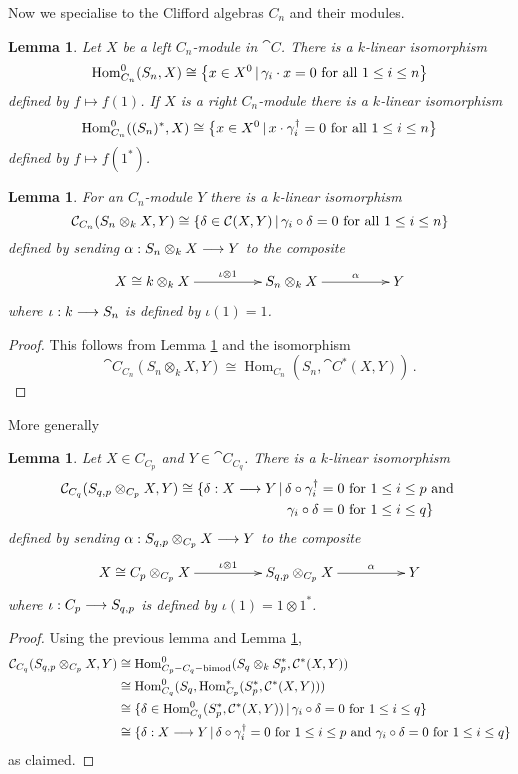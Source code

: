 \documentclass[english,letter paper,12pt,leqno]{article}
\newtheorem{lemma}[theorem]{Lemma}
\theoremstyle{example}
\numberwithin{equation}{section}
\def\Hom{\operatorname{Hom}}
\def\ferm{\gamma}
\def\fermc{\gamma^\dagger}
\begin{document}
Now we specialise to the Clifford algebras $C_n$ and their modules.

\begin{lemma}\label{lemma:simplehom} Let $X$ be a left $C_n$-module in $\cat{C}$. There is a $k$-linear isomorphism
\[
\Hom_{C_n}^0( S_n, X ) \cong \big\{ x \in X^0 \l \ferm_i \cdot x = 0 \text{ for all } 1 \le i \le n \big\}
\]
defined by $f \mapsto f(1)$. If $X$ is a right $C_n$-module there is a $k$-linear isomorphism
\[
\Hom^0_{C_n}( (S_n)^*, X ) \cong \big\{ x \in X^0 \l x \cdot \fermc_i = 0 \text{ for all } 1 \le i \le n \big\}
\]
defined by $f \mapsto f(1^*)$.
\end{lemma}

\begin{lemma}\label{lemma:morphism_out_1} For an $C_n$-module $Y$ there is a $k$-linear isomorphism
\[
\cat{C}_{C_n}( S_n \otimes_k X, Y ) \cong \{ \delta \in \cat{C}(X,Y) \l \ferm_i \circ \delta = 0 \text{ for all } 1 \le i \le n \}
\]
defined by sending $\alpha: S_n \otimes_k X \longrightarrow Y$ to the composite
\[
\xymatrix@C+2pc{
X \cong k \otimes_k X \ar[r]^-{\iota \otimes 1} & S_n \otimes_k X \ar[r]^-{\alpha} & Y
}
\]
where $\iota: k \longrightarrow S_n$ is defined by $\iota(1) = 1$.
\end{lemma}
\begin{proof}
This follows from Lemma \ref{lemma:simplehom} and the isomorphism
\[
\cat{C}_{C_n}(S_n \otimes_k X, Y ) \cong \Hom_{C_n}( S_n, \cat{C}^*(X,Y) )\,.
\]
\end{proof}

More generally

\begin{lemma}\label{lemma:morphisms_two_forms} Let $X \in C_{C_p}$ and $Y \in \cat{C}_{C_q}$. There is a $k$-linear isomorphism
\begin{align*}
\cat{C}_{C_q}( S_{q,p} \otimes_{C_p} X, Y ) \cong \{ \delta: X \lto Y \l \delta \circ \fermc_i &= 0 \text{ for } 1 \le i \le p \text{ and }\\ \ferm_i \circ \delta &= 0 \text{ for } 1 \le i \le q \}
\end{align*}
defined by sending $\alpha: S_{q,p} \otimes_{C_p} X \longrightarrow Y$ to the composite
\[
\xymatrix@C+2pc{
X \cong C_p \otimes_{C_p} X \ar[r]^-{\iota \otimes 1} & S_{q,p} \otimes_{C_p} X \ar[r]^-{\alpha} & Y
}
\]
where $\iota: C_p \longrightarrow S_{q,p}$ is defined by $\iota(1) = 1 \otimes 1^*$.
\end{lemma}
\begin{proof}
Using the previous lemma and Lemma \ref{lemma:simplehom},
\begin{align*}
\cat{C}_{C_q}( S_{q,p} \otimes_{C_p} X, Y ) &\cong \Hom^0_{C_p-C_q-\operatorname{bimod}}( S_{q} \otimes_k S_p^* , \cat{C}^*(X,Y))\\
&\cong \Hom^0_{C_q}( S_q, \Hom^*_{C_p}( S_p^*, \cat{C}^*(X,Y) ))\\
&\cong \{ \delta \in \Hom^0_{C_q}( S_p^*, \cat{C}^*(X,Y) ) \l \ferm_i \circ \delta = 0 \text{ for } 1 \le i \le q \}\\
&\cong \{ \delta: X \lto Y \l \delta \circ \fermc_i = 0 \text{ for } 1 \le i \le p \text{ and } \ferm_i \circ \delta = 0 \text{ for } 1 \le i \le q \}
\end{align*}
as claimed.
\end{proof}
\end{document}
